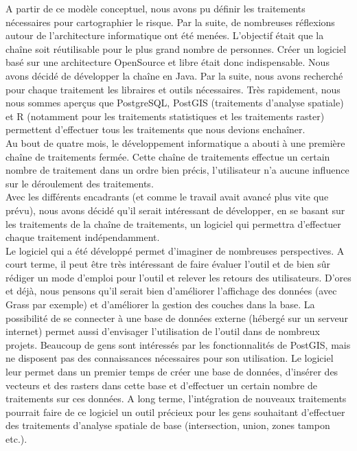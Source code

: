 A partir de ce modèle conceptuel, nous avons pu définir les traitements nécessaires pour cartographier le risque. Par la suite,  de nombreuses réflexions autour de l'architecture informatique ont été menées. L'objectif était que la chaîne soit réutilisable pour le plus grand nombre de personnes. Créer un logiciel basé sur une architecture OpenSource et libre était donc indispensable. Nous avons décidé de développer la chaîne en Java. Par la suite, nous avons recherché pour chaque traitement les libraires et outils nécessaires. Très rapidement, nous nous sommes aperçus que PostgreSQL, PostGIS (traitements d'analyse spatiale) et R (notamment pour les traitements statistiques et les traitements raster) permettent d'effectuer tous les traitements que nous devions enchaîner.\\

Au bout de quatre mois, le développement informatique a abouti à une première chaîne de traitements fermée. Cette chaîne de traitements effectue un certain nombre de traitement dans un ordre bien précis, l'utilisateur n'a aucune influence sur le déroulement des traitements.\\

Avec les différents encadrants (et comme le travail avait avancé plus vite que prévu), nous avons décidé qu'il serait intéressant de développer, en se basant sur les traitements de la chaîne de traitements, un logiciel qui permettra d'effectuer chaque traitement indépendamment.\\

Le logiciel qui a été développé permet d'imaginer de nombreuses perspectives. A court terme, il peut être très intéressant de faire évaluer l'outil et de bien sûr rédiger un mode d'emploi pour l'outil et relever les retours des utilisateurs. D'ores et déjà, nous pensons qu'il serait bien  d'améliorer l'affichage des données (avec Grass par exemple) et d'améliorer la gestion des couches dans la base. La possibilité de se connecter à une base de données externe (hébergé sur un serveur internet) permet aussi d'envisager l'utilisation de l'outil dans de nombreux projets. Beaucoup de gens sont intéressés par les fonctionnalités de PostGIS, mais ne disposent pas des connaissances nécessaires pour son utilisation. Le logiciel leur permet dans un premier temps de créer une base de données, d'insérer des vecteurs et des rasters dans cette base et d'effectuer un certain nombre de traitements sur ces données. A long terme, l'intégration de nouveaux traitements pourrait faire de ce logiciel un outil précieux pour les gens souhaitant d'effectuer des traitements d'analyse spatiale de base (intersection, union, zones tampon etc.).


